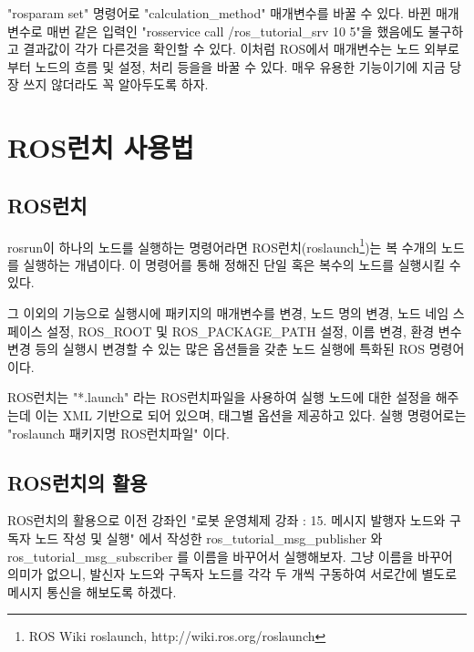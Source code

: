 "rosparam set" 명령어로 "calculation\_method" 매개변수를 바꿀 수 있다. 바뀐 매개변수로 매번 같은 입력인 "rosservice call /ros\_tutorial\_srv 10 5"을 했음에도 불구하고 결과값이 각가 다른것을 확인할 수 있다.  이처럼 ROS에서 매개변수는 노드 외부로부터 노드의 흐름 및 설정, 처리 등을을 바꿀 수 있다. 매우 유용한 기능이기에 지금 당장 쓰지 않더라도 꼭 알아두도록 하자.


\section{ROS런치 사용법}

\subsection{ROS런치}

\begin{definition}[roslaunch]
rosrun이 하나의 노드를 실행하는 명령어라면 ROS런치(roslaunch\footnote{ROS Wiki roslaunch, http://wiki.ros.org/roslaunch})는 복 수개의 노드를 실행하는 개념이다. 이 명령어를 통해 정해진 단일 혹은 복수의 노드를 실행시킬 수 있다. 

그 이외의 기능으로 실행시에 패키지의 매개변수를 변경, 노드 명의 변경, 노드 네임 스페이스 설정, ROS\_ROOT 및 ROS\_PACKAGE\_PATH 설정, 이름 변경, 환경 변수 변경 등의 실행시 변경할 수 있는 많은 옵션들을 갖춘 노드 실행에 특화된 ROS 명령어이다. 

ROS런치는 "*.launch" 라는 ROS런치파일을 사용하여 실행 노드에 대한 설정을 해주는데 이는 XML 기반으로 되어 있으며, 태그별 옵션을 제공하고 있다. 실행 명령어로는 "roslaunch 패키지명 ROS런치파일" 이다.
\end{definition}

\subsection{ROS런치의 활용}

ROS런치의 활용으로 이전 강좌인 "로봇 운영체제 강좌 : 15. 메시지 발행자 노드와 구독자 노드 작성 및 실행" 에서 작성한 ros\_tutorial\_msg\_publisher 와  ros\_tutorial\_msg\_subscriber 를 이름을 바꾸어서 실행해보자. 그냥 이름을 바꾸어 의미가 없으니, 발신자 노드와 구독자 노드를 각각 두 개씩 구동하여 서로간에 별도로 메시지 통신을 해보도록 하겠다.


